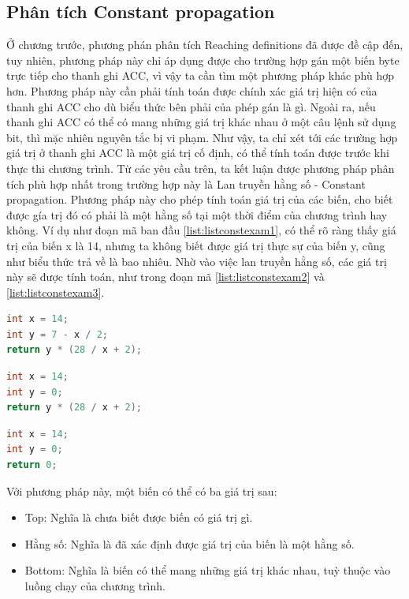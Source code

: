 \subsection{Phân tích Constant propagation}
Ở chương trước, phương phán phân tích Reaching definitions đã được đề cập đến, tuy nhiên, phương pháp này chỉ áp dụng được cho trường hợp gán một biến byte trực tiếp cho thanh ghi ACC, vì vậy ta cần tìm một phương pháp khác phù hợp hơn. Phương pháp này cần phải tính toán được chính xác giá trị hiện có của thanh ghi ACC cho dù biểu thức bên phải của phép gán là gì. Ngoài ra, nếu thanh ghi ACC có thể có mang những giá trị khác nhau ở một câu lệnh sử dụng bit, thì mặc nhiên nguyên tắc bị vi phạm. Như vậy, ta chỉ xét tới các trường hợp giá trị ở thanh ghi ACC là một giá trị cố định, có thể tính toán được trước khi thực thi chương trình. Từ các yêu cầu trên, ta kết luận được phương pháp phân tích phù hợp nhất trong trường hợp này là Lan truyền hằng số - Constant propagation. Phương pháp này cho phép tính toán giá trị của các biến, cho biết được gía trị đó có phải là một hằng số tại một thời điểm của chương trình hay không. Ví dụ như đoạn mã ban đầu \ref{list:listconstexam1}, có thể rõ ràng thấy giá trị của biến x là 14, nhưng ta không biết được giá trị thực sự của biến y, cũng như biểu thức trả về là bao nhiêu. Nhờ vào việc lan truyền hằng số, các giá trị này sẽ được tính toán, như trong đoạn mã \ref{list:listconstexam2} và \ref{list:listconstexam3}.
\begin{lstlisting}[caption={Đoạn mã trước khi thực hiện lan truyền hằng số},label={list:listconstexam1}, language=c++]
 int x = 14;
int y = 7 - x / 2;
return y * (28 / x + 2);
\end{lstlisting}
\begin{lstlisting}[caption={Đoạn mã sau khi thực hiện lan truyền hằng số cho biến y},label={list:listconstexam2}, language=c++]
int x = 14;
int y = 0;
return y * (28 / x + 2);
\end{lstlisting}
\begin{lstlisting}[caption={Đoạn mã sau khi thực hiện lan truyền hằng số cho biểu thức trả về},label={list:listconstexam3}, language=c++]
int x = 14;
int y = 0;
return 0;
\end{lstlisting}
Với phương pháp này, một biến có thể có ba giá trị sau:
\begin{itemize}
	\item Top: Nghĩa là chưa biết được biến có giá trị gì.
	\item Hằng số: Nghĩa là đã xác định được giá trị của biến là một hằng số.
	\item Bottom: Nghĩa là biến có thể mang những giá trị khác nhau, tuỳ thuộc vào luồng chạy của chương trình.
\end{itemize}

